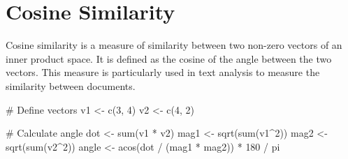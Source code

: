 \documentclass[
  letterpaper,
  DIV=11,
  numbers=noendperiod]{scrartcl}
\newenvironment{Shaded}{\begin{snugshade}}{\end{snugshade}}
\newcommand{\CommentTok}[1]{\textcolor[rgb]{0.37,0.37,0.37}{#1}}
\newcommand{\DecValTok}[1]{\textcolor[rgb]{0.68,0.00,0.00}{#1}}
\newcommand{\FunctionTok}[1]{\textcolor[rgb]{0.28,0.35,0.67}{#1}}
\newcommand{\NormalTok}[1]{\textcolor[rgb]{0.00,0.23,0.31}{#1}}
\newcommand{\OtherTok}[1]{\textcolor[rgb]{0.00,0.23,0.31}{#1}}
\newcommand{\SpecialCharTok}[1]{\textcolor[rgb]{0.37,0.37,0.37}{#1}}
\begin{document}
\section{Cosine Similarity}\label{cosine-similarity}

Cosine similarity is a measure of similarity between two non-zero
vectors of an inner product space. It is defined as the cosine of the
angle between the two vectors. This measure is particularly used in text
analysis to measure the similarity between documents.

\begin{Shaded}
\begin{Highlighting}[]
\CommentTok{\# Define vectors}
\NormalTok{v1 }\OtherTok{\textless{}{-}} \FunctionTok{c}\NormalTok{(}\DecValTok{3}\NormalTok{, }\DecValTok{4}\NormalTok{)}
\NormalTok{v2 }\OtherTok{\textless{}{-}} \FunctionTok{c}\NormalTok{(}\DecValTok{4}\NormalTok{, }\DecValTok{2}\NormalTok{)}

\CommentTok{\# Calculate angle}
\NormalTok{dot }\OtherTok{\textless{}{-}} \FunctionTok{sum}\NormalTok{(v1 }\SpecialCharTok{*}\NormalTok{ v2)}
\NormalTok{mag1 }\OtherTok{\textless{}{-}} \FunctionTok{sqrt}\NormalTok{(}\FunctionTok{sum}\NormalTok{(v1}\SpecialCharTok{\^{}}\DecValTok{2}\NormalTok{))}
\NormalTok{mag2 }\OtherTok{\textless{}{-}} \FunctionTok{sqrt}\NormalTok{(}\FunctionTok{sum}\NormalTok{(v2}\SpecialCharTok{\^{}}\DecValTok{2}\NormalTok{))}
\NormalTok{angle }\OtherTok{\textless{}{-}} \FunctionTok{acos}\NormalTok{(dot }\SpecialCharTok{/}\NormalTok{ (mag1 }\SpecialCharTok{*}\NormalTok{ mag2)) }\SpecialCharTok{*} \DecValTok{180} \SpecialCharTok{/}\NormalTok{ pi}


\end{Highlighting}
\end{Shaded}
\end{document}
